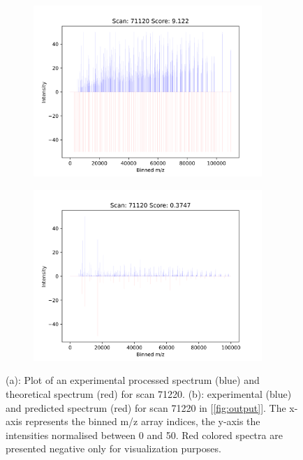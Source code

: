 \documentclass[11pt]{article}
\begin{document}
\begin{figure}
\centering
\begin{subfigure}[b]{1\textwidth}
    \includegraphics[width=0.95\textwidth]{figs/scan_71120_ps=False.png}
   \caption{}
   \label{fig:theo} 
\end{subfigure}
\begin{subfigure}[b]{1\textwidth}
   \includegraphics[width=0.95\textwidth]{figs/scan_71120_ps=True.png}
   \caption{}
   \label{fig:predict}
\end{subfigure}

\caption{(a): Plot of an experimental processed spectrum (blue) and theoretical spectrum (red) for scan 71220. (b): experimental (blue) and predicted spectrum (red) for scan 71220 in [\cref{fig:output}]. The x-axis represents the binned m/z array indices, the y-axis the intensities normalised between 0 and 50. Red colored spectra are presented negative only for visualization purposes.}
\label{predandtheo}
\end{figure}
\end{document}
